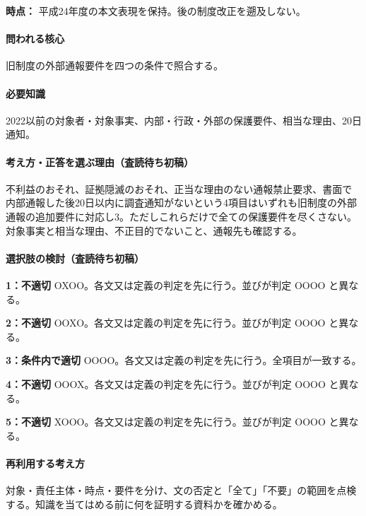 \noindent\textbf{時点：} 平成24年度の本文表現を保持。後の制度改正を遡及しない。\par

\paragraph{問われる核心} 旧制度の外部通報要件を四つの条件で照合する。

\paragraph{必要知識} 2022以前の対象者・対象事実、内部・行政・外部の保護要件、相当な理由、20日通知。

\paragraph{考え方・正答を選ぶ理由（査読待ち初稿）} 不利益のおそれ、証拠隠滅のおそれ、正当な理由のない通報禁止要求、書面で内部通報した後20日以内に調査通知がないという4項目はいずれも旧制度の外部通報の追加要件に対応し3。ただしこれらだけで全ての保護要件を尽くさない。対象事実と相当な理由、不正目的でないこと、通報先も確認する。

\paragraph{選択肢の検討（査読待ち初稿）}\mbox{}\par

\noindent\textbf{1：不適切} OXOO。各文又は定義の判定を先に行う。並びが判定 OOOO と異なる。\par

\noindent\textbf{2：不適切} OOXO。各文又は定義の判定を先に行う。並びが判定 OOOO と異なる。\par

\noindent\textbf{3：条件内で適切} OOOO。各文又は定義の判定を先に行う。全項目が一致する。\par

\noindent\textbf{4：不適切} OOOX。各文又は定義の判定を先に行う。並びが判定 OOOO と異なる。\par

\noindent\textbf{5：不適切} XOOO。各文又は定義の判定を先に行う。並びが判定 OOOO と異なる。\par

\paragraph{再利用する考え方} 対象・責任主体・時点・要件を分け、文の否定と「全て」「不要」の範囲を点検する。知識を当てはめる前に何を証明する資料かを確かめる。

